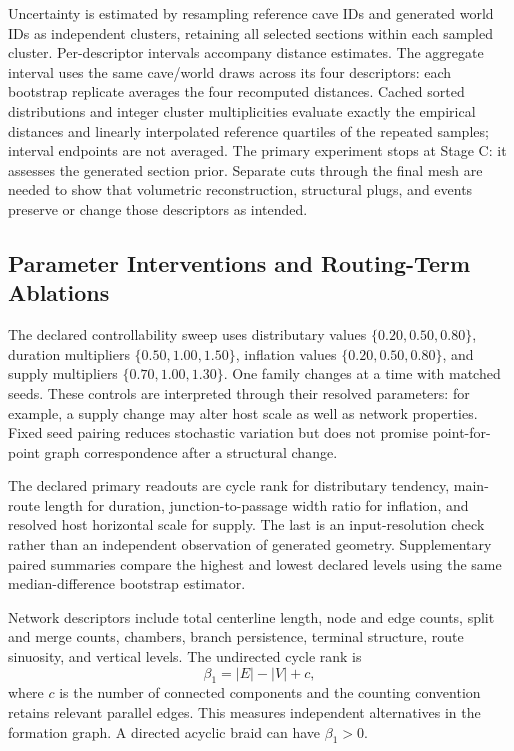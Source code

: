 \documentclass[conference]{IEEEtran}
\begin{document}
Uncertainty is estimated by resampling reference cave IDs and generated world IDs as independent clusters, retaining all selected sections within each sampled cluster. Per-descriptor intervals accompany distance estimates. The aggregate interval uses the same cave/world draws across its four descriptors: each bootstrap replicate averages the four recomputed distances. Cached sorted distributions and integer cluster multiplicities evaluate exactly the empirical distances and linearly interpolated reference quartiles of the repeated samples; interval endpoints are not averaged. The primary experiment stops at Stage C: it assesses the generated section prior. Separate cuts through the final mesh are needed to show that volumetric reconstruction, structural plugs, and events preserve or change those descriptors as intended.



\subsection{Parameter Interventions and Routing-Term Ablations}
The declared controllability sweep uses distributary values $\{0.20,0.50,0.80\}$, duration multipliers $\{0.50,1.00,1.50\}$, inflation values $\{0.20,0.50,0.80\}$, and supply multipliers $\{0.70,1.00,1.30\}$. One family changes at a time with matched seeds. These controls are interpreted through their resolved parameters: for example, a supply change may alter host scale as well as network properties. Fixed seed pairing reduces stochastic variation but does not promise point-for-point graph correspondence after a structural change.

The declared primary readouts are cycle rank for distributary tendency, main-route length for duration, junction-to-passage width ratio for inflation, and resolved host horizontal scale for supply. The last is an input-resolution check rather than an independent observation of generated geometry. Supplementary paired summaries compare the highest and lowest declared levels using the same median-difference bootstrap estimator.

Network descriptors include total centerline length, node and edge counts, split and merge counts, chambers, branch persistence, terminal structure, route sinuosity, and vertical levels. The undirected cycle rank is
\begin{equation}
\beta_1=|E|-|V|+c,
\label{eq:cycles}
\end{equation}
where $c$ is the number of connected components and the counting convention retains relevant parallel edges. This measures independent alternatives in the formation graph. A directed acyclic braid can have $\beta_1>0$.
\end{document}
